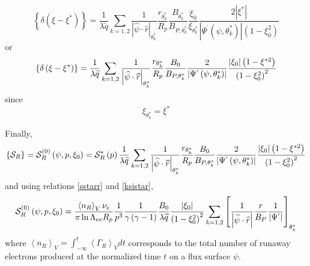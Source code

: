 \begin{equation}
\left\{ \delta \left( \xi -\xi ^{*}\right) \right\} =\frac{1}{\lambda
\widetilde{q}}\sum_{k=1,2}\frac{1}{\left| \widehat{\psi }\cdot \widehat{r}
\right| _{\theta _{k}^{*}}}\frac{r_{\theta _{k}^{*}}}{R_{p}}\frac{B_{\theta
_{k}^{*}}}{B_{P,\theta _{k}^{*}}}\frac{\xi _{0}}{\xi _{\theta _{k}^{*}}}%
\frac{2\left| \xi ^{*}\right| }{\left| \Psi ^{^{\prime }}\left( \psi ,\theta
_{k}^{*}\right) \right| \left( 1-\xi _{0}^{2}\right) }
\end{equation}
or
\begin{equation}
\left\{ \delta \left( \xi -\xi ^{*}\right) \right\} =\frac{1}{\lambda
\widetilde{q}}\sum_{k=1,2}\frac{1}{\left| \widehat{\psi }\cdot \widehat{r}
\right| _{\theta _{k}^{*}}}\frac{r_{\theta _{k}^{*}}}{R_{p}}\frac{B_{0}}{%
B_{P,\theta _{k}^{*}}}\frac{2}{\left| \Psi ^{^{\prime }}\left( \psi ,\theta
_{k}^{*}\right) \right| }\frac{\left| \xi _{0}\right| \left( 1-\xi
^{*2}\right) }{\left( 1-\xi _{0}^{2}\right) ^{2}}
\end{equation}
since
\begin{equation}
\xi _{\theta _{k}^{*}}=\xi ^{*}
\end{equation}

Finally,
\begin{equation}
\left\{ \mathcal{S}_{R}\right\} =\mathcal{S}_{R}^{\left( 0\right) }\left(
\psi ,p,\xi _{0}\right) =\mathcal{S}_{R}^{*}\left( p\right) \frac{1}{\lambda
\widetilde{q}}\sum_{k=1,2}\frac{1}{\left| \widehat{\psi }\cdot \widehat{r}
\right| _{\theta _{k}^{*}}}\frac{r_{\theta _{k}^{*}}}{R_{p}}\frac{B_{0}}{%
B_{P,\theta _{k}^{*}}}\frac{2}{\left| \Psi ^{^{\prime }}\left( \psi ,\theta
_{k}^{*}\right) \right| }\frac{\left| \xi _{0}\right| \left( 1-\xi
^{*2}\right) }{\left( 1-\xi _{0}^{2}\right) ^{2}}
\end{equation}
and using relations \ref{sstarr} and \ref{ksistar},
\begin{equation}
\mathcal{S}_{R}^{\left( 0\right) }\left( \psi ,p,\xi _{0}\right) =\frac{%
\left\langle n_{R}\right\rangle _{V}\nu _{e}}{\pi \ln \Lambda _{ee}R_{p}}%
\frac{1}{p^{3}}\frac{1}{\gamma \left( \gamma -1\right) }\frac{B_{0}}{\lambda
\widetilde{q}}\frac{\left| \xi _{0}\right| }{\left( 1-\xi _{0}^{2}\right)
^{2}}\sum_{k=1,2}\left[ \frac{1}{\left| \widehat{\psi }\cdot \widehat{r}
\right| }\frac{r}{B_{P}}\frac{1}{\left| \Psi ^{^{\prime }}\right| }\right]
_{\theta _{k}^{*}}  \label{bavavalanchesourceterm}
\end{equation}
where $\left\langle n_{R}\right\rangle _{V}=\int_{-\infty }^{t}\left\langle
\Gamma _{R}\right\rangle _{V}dt$ corresponds to the total number of runaway
electrons produced at the normalized time $t$ on a flux surface $\psi .$

